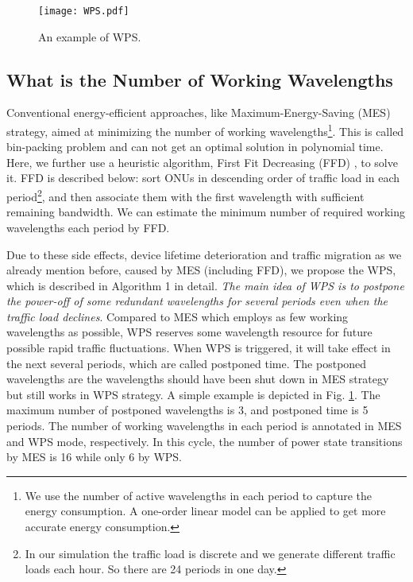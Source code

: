 \documentclass[letter]{IEEEtran}
\begin{document}
\begin{figure}[t]
    \centering 
        \texttt{[image: WPS.pdf]}\\ 
    \caption{ An example of WPS.}
    \label{WPS}
    \vspace{-6.0mm}
\end{figure}

\subsection{What is the Number of Working Wavelengths}
Conventional energy-efficient approaches, like Maximum-Energy-Saving (MES) strategy, aimed at minimizing the number of working wavelengths\footnote{We use the number of active wavelengths in each period to capture the energy consumption. A one-order linear model can be applied to get more accurate energy consumption.}. This is called bin-packing problem and can not get an optimal solution in polynomial time. Here, we further use a heuristic algorithm, First Fit Decreasing (FFD) \cite{baker1985new}, to solve it. FFD is described below: sort ONUs in descending order of traffic load in each period\footnote{In our simulation the traffic load is discrete and we generate different traffic loads each hour. So there are 24 periods in one day.}, and then associate them with the first wavelength with sufficient remaining bandwidth. We can estimate the minimum number of required working wavelengths each period by FFD.

Due to these side effects, device lifetime deterioration and traffic migration as we already mention before, caused by MES (including FFD), we propose the WPS, which is described in Algorithm 1 in detail. \emph{The main idea of WPS is to postpone the power-off of some redundant wavelengths for several periods even when the traffic load declines}. Compared to MES which employs as few working wavelengths as possible, WPS reserves some wavelength resource for future possible rapid traffic fluctuations. When WPS is triggered, it will take effect in the next several periods, which are called postponed time. The postponed wavelengths are the wavelengths should have been shut down in MES strategy but still works in WPS strategy. A simple example is depicted in Fig. \ref{WPS}. The maximum number of postponed wavelengths is 3, and postponed time is 5 periods. The number of working wavelengths in each period is annotated in MES and WPS mode, respectively. In this cycle, the number of power state transitions by MES is 16 while only 6 by WPS. 
\end{document}
